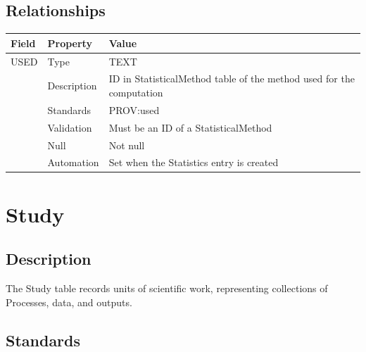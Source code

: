 \subsection{Relationships}\label{relationships-27}

\begin{longtable}[]{@{}
  >{\raggedright\arraybackslash}p{}
  >{\raggedright\arraybackslash}p{}
  >{\raggedright\arraybackslash}p{}@{}}
\toprule\noalign{}
\begin{minipage}[b]{\linewidth}\raggedright
Field
\end{minipage} & \begin{minipage}[b]{\linewidth}\raggedright
Property
\end{minipage} & \begin{minipage}[b]{\linewidth}\raggedright
Value
\end{minipage} \\
\midrule\noalign{}
\endhead
\bottomrule\noalign{}
\endlastfoot
USED & Type & TEXT \\
& Description & ID in StatisticalMethod table of the method used for the
computation \\
& Standards & PROV:used \\
& Validation & Must be an ID of a StatisticalMethod \\
& Null & Not null \\
& Automation & Set when the Statistics entry is created \\
\end{longtable}

\section{Study}\label{study}

\subsection{Description}\label{description-32}

The Study table records units of scientific work, representing
collections of Processes, data, and outputs.

\subsection{Standards}\label{standards-34}


